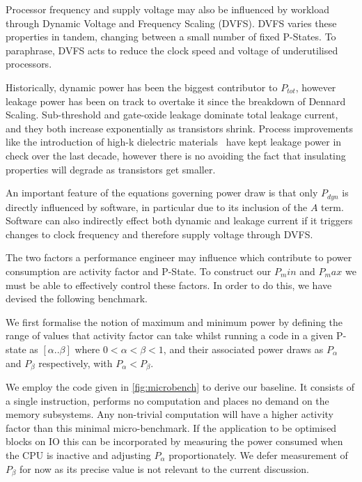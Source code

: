 Processor frequency and supply voltage may also be influenced by workload through Dynamic Voltage and Frequency Scaling (DVFS).
DVFS varies these properties in tandem, changing between a small number of fixed P-States.
To paraphrase, DVFS acts to reduce the clock speed and voltage of underutilised processors.


Historically, dynamic power has been the biggest contributor to $P_{tot}$, however leakage power has been on track to overtake it since the breakdown of Dennard Scaling.  Sub-threshold and gate-oxide leakage dominate total leakage current, and they both increase exponentially as transistors shrink. Process improvements like the introduction of high-k dielectric materials~\cite{jan:2009aa} have kept leakage power in check over the last decade, however there is no avoiding the fact that insulating properties will degrade as transistors get smaller.

An important feature of the equations governing power draw is that only $P_{dyn}$ is directly influenced by software, in particular due to its inclusion of the $A$ term. Software can also indirectly effect both dynamic and leakage current if it triggers changes to clock frequency and therefore supply voltage through DVFS.  

The two factors a performance engineer may influence which contribute to power consumption are activity factor and P-State.
To construct our $P_min$ and $P_max$ we must be able to effectively control these factors.
In order to do this, we have devised the following benchmark.



We first formalise the notion of maximum and minimum power by defining the range of values that activity factor can take whilst running a code in a given P-state as $[\alpha  .. \beta]$ where $0 < \alpha < \beta < 1$, and their associated power draws as $P_{\alpha}$ and $P_{\beta}$ respectively, with $P_{\alpha} < P_{\beta}$.

We employ the code given in \autoref{fig:microbench} to derive our baseline.  It consists of a single instruction, performs no computation and places no demand on the memory subsystems. Any non-trivial computation will have a higher activity factor than this minimal micro-benchmark. If the application to be optimised blocks on IO this can be incorporated by measuring the power consumed when the CPU is inactive and adjusting $P_\alpha$ proportionately. We defer measurement of $P_{\beta}$ for now as its precise value is not relevant to the current discussion. 



